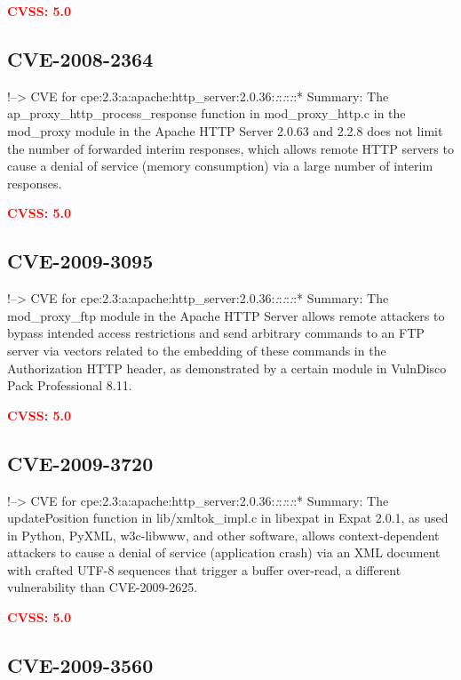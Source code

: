 \documentclass[a4paper, 12pt]{article}
\begin{document}
\textbf{\textcolor{red}{CVSS: 5.0}}

\hypertarget{cve-2008-2364}{%
\subsection{CVE-2008-2364}\label{cve-2008-2364}}

!--\textgreater{} CVE for
cpe:2.3:a:apache:http\_server:2.0.36:\emph{:}:\emph{:}:\emph{:}:*
Summary: The ap\_proxy\_http\_process\_response function in
mod\_proxy\_http.c in the mod\_proxy module in the Apache HTTP Server
2.0.63 and 2.2.8 does not limit the number of forwarded interim
responses, which allows remote HTTP servers to cause a denial of service
(memory consumption) via a large number of interim responses.

\textbf{\textcolor{red}{CVSS: 5.0}}

\hypertarget{cve-2009-3095}{%
\subsection{CVE-2009-3095}\label{cve-2009-3095}}

!--\textgreater{} CVE for
cpe:2.3:a:apache:http\_server:2.0.36:\emph{:}:\emph{:}:\emph{:}:*
Summary: The mod\_proxy\_ftp module in the Apache HTTP Server allows
remote attackers to bypass intended access restrictions and send
arbitrary commands to an FTP server via vectors related to the embedding
of these commands in the Authorization HTTP header, as demonstrated by a
certain module in VulnDisco Pack Professional 8.11.

\textbf{\textcolor{red}{CVSS: 5.0}}

\hypertarget{cve-2009-3720}{%
\subsection{CVE-2009-3720}\label{cve-2009-3720}}

!--\textgreater{} CVE for
cpe:2.3:a:apache:http\_server:2.0.36:\emph{:}:\emph{:}:\emph{:}:*
Summary: The updatePosition function in lib/xmltok\_impl.c in libexpat
in Expat 2.0.1, as used in Python, PyXML, w3c-libwww, and other
software, allows context-dependent attackers to cause a denial of
service (application crash) via an XML document with crafted UTF-8
sequences that trigger a buffer over-read, a different vulnerability
than CVE-2009-2625.

\textbf{\textcolor{red}{CVSS: 5.0}}

\hypertarget{cve-2009-3560}{%
\subsection{CVE-2009-3560}\label{cve-2009-3560}}
\end{document}
